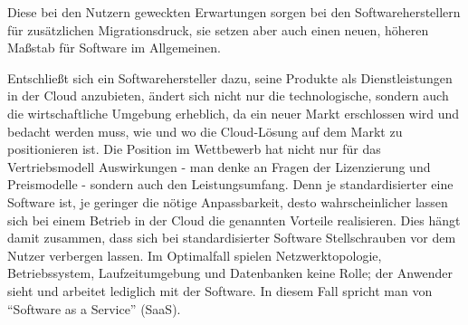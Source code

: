 Diese bei den Nutzern geweckten Erwartungen sorgen bei den Softwareherstellern
für zusätzlichen Migrationsdruck, sie setzen aber auch einen neuen, höheren
Maßstab für Software im Allgemeinen.

Entschließt sich ein Softwarehersteller dazu, seine Produkte
als Dienstleistungen in der Cloud anzubieten, ändert sich nicht nur die
technologische, sondern auch die wirtschaftliche Umgebung erheblich, da ein
neuer Markt erschlossen wird und bedacht werden muss, wie und wo die
Cloud-Lösung auf dem Markt zu positionieren ist. Die Position im Wettbewerb hat
nicht nur für das Vertriebsmodell  Auswirkungen - man
denke an Fragen der Lizenzierung und Preismodelle - sondern auch den
Leistungsumfang. Denn je standardisierter eine Software ist, je
geringer die nötige Anpassbarkeit, desto wahrscheinlicher lassen sich bei einem
Betrieb in der
Cloud die genannten Vorteile realisieren.  Dies
hängt damit zusammen, dass sich bei standardisierter Software Stellschrauben
vor dem Nutzer verbergen lassen. Im Optimalfall spielen Netzwerktopologie,
Betriebssystem, Laufzeitumgebung und Datenbanken keine Rolle; der Anwender
sieht und arbeitet lediglich mit der Software. In diesem Fall spricht man von
"`Software as a Service"' (SaaS). 


